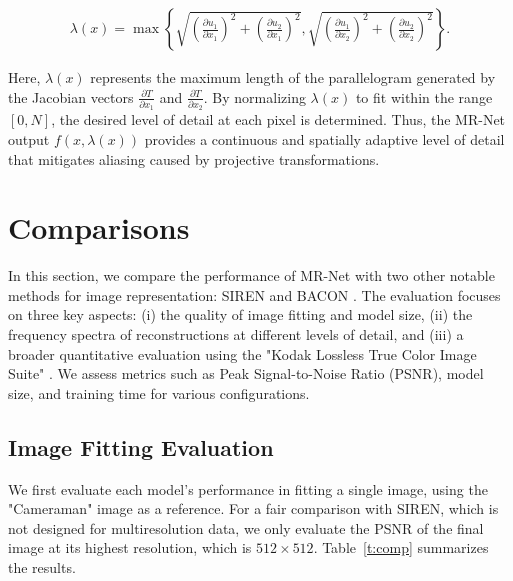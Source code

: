 
\begin{align*}
    \lambda(x)=\max\left\{\sqrt{\left(\frac{\partial u_1}{\partial x_1}\right)^2+\left(\frac{\partial u_2}{\partial x_1}\right)^2}, \sqrt{\left(\frac{\partial u_1}{\partial x_2}\right)^2+\left(\frac{\partial u_2}{\partial x_2}\right)^2}\right\}.
\end{align*}


Here, \(\lambda(x)\) represents the maximum length of the parallelogram generated by the Jacobian vectors \(\frac{\partial T}{\partial x_1}\) and \(\frac{\partial T}{\partial x_2}\). By normalizing \(\lambda(x)\) to fit within the range \([0, N]\), the desired level of detail at each pixel is determined. Thus, the MR-Net output \(f(x, \lambda(x))\) provides a continuous and spatially adaptive level of detail that mitigates aliasing caused by projective transformations.

\section{Comparisons}

In this section, we compare the performance of MR-Net with two other notable methods for image representation: SIREN \citep{sitzmann2019siren} and BACON \citep{bacon2021}. The evaluation focuses on three key aspects: (i) the quality of image fitting and model size, (ii) the frequency spectra of reconstructions at different levels of detail, and (iii) a broader quantitative evaluation using the "Kodak Lossless True Color Image Suite" \citep{KodakDataset}. We assess metrics such as Peak Signal-to-Noise Ratio (PSNR), model size, and training time for various configurations.

\subsection{Image Fitting Evaluation}

We first evaluate each model's performance in fitting a single image, using the "Cameraman" image as a reference. For a fair comparison with SIREN, which is not designed for multiresolution data, we only evaluate the PSNR of the final image at its highest resolution, which is $512 \times 512$. Table~\ref{t:comp} summarizes the results.

